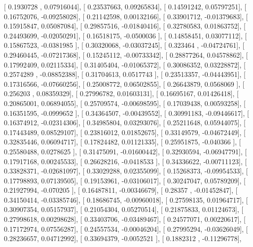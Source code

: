 \documentclass{article}
\begin{document}
       [ 0.1930728 ,  0.07916044],
       [ 0.23537663,  0.09265834],
       [ 0.14591242,  0.05797251],
       [ 0.16752076, -0.09258028],
       [ 0.21142598,  0.00132166],
       [ 0.33901712, -0.01379683],
       [ 0.15915847,  0.05087084],
       [ 0.29857516, -0.01840416],
       [ 0.32780583,  0.01863752],
       [ 0.24493699, -0.02050291],
       [ 0.16518175, -0.0500036 ],
       [ 0.14858451,  0.03077112],
       [ 0.15867523, -0.0381985 ],
       [ 0.30320068, -0.03037245],
       [ 0.323464  , -0.04724761],
       [ 0.29460445, -0.07217368],
       [ 0.15245112, -0.00733342],
       [ 0.28877264,  0.04578862],
       [ 0.17992409,  0.02115334],
       [ 0.31405404, -0.01065372],
       [ 0.30086352,  0.03228872],
       [ 0.2574289 , -0.08852388],
       [ 0.31704613,  0.0517743 ],
       [ 0.23513357, -0.04443951],
       [ 0.17316566, -0.07660256],
       [ 0.25008772,  0.06502855],
       [ 0.26643879,  0.0568069 ],
       [ 0.256203  ,  0.08359329],
       [ 0.27996782,  0.01603131],
       [ 0.16695167,  0.01426418],
       [ 0.20865001,  0.06894055],
       [ 0.25709574, -0.00698595],
       [ 0.17039438,  0.00593258],
       [ 0.16351595, -0.0999652 ],
       [ 0.34364507, -0.00439552],
       [ 0.30991183, -0.09446617],
       [ 0.16374912, -0.02314306],
       [ 0.34985804,  0.03293076],
       [ 0.25211648,  0.05944075],
       [ 0.17443489,  0.08529107],
       [ 0.23816012,  0.01852675],
       [ 0.33149579, -0.04672449],
       [ 0.32835446,  0.06094717],
       [ 0.17824482,  0.01121335],
       [ 0.25951875, -0.040366  ],
       [ 0.25580488,  0.0278625 ],
       [ 0.31475091, -0.01600442],
       [ 0.32930594, -0.06947791],
       [ 0.17917168,  0.00245533],
       [ 0.26628216, -0.0418533 ],
       [ 0.34336622, -0.00711123],
       [ 0.33828371, -0.02681097],
       [ 0.33029288,  0.02355099],
       [ 0.15268373, -0.09954533],
       [ 0.17798893,  0.07139505],
       [ 0.19153961, -0.03106017],
       [ 0.30247047,  0.05789209],
       [ 0.21927994, -0.070205  ],
       [ 0.16487811, -0.00346679],
       [ 0.28357   , -0.01452847],
       [ 0.34150414, -0.03385746],
       [ 0.18686745, -0.00960018],
       [ 0.27598135,  0.01964717],
       [ 0.30907354,  0.05157937],
       [ 0.21054304,  0.05270514],
       [ 0.21875833,  0.01124673],
       [ 0.27998618,  0.00298628],
       [ 0.33403706, -0.03489467],
       [ 0.24577071,  0.00220617],
       [ 0.17172974,  0.07556287],
       [ 0.24557534, -0.00046204],
       [ 0.27995294, -0.03626049],
       [ 0.28236657,  0.04712992],
       [ 0.33694379, -0.0052521 ],
       [ 0.1882312 , -0.11296778],
\end{document}
